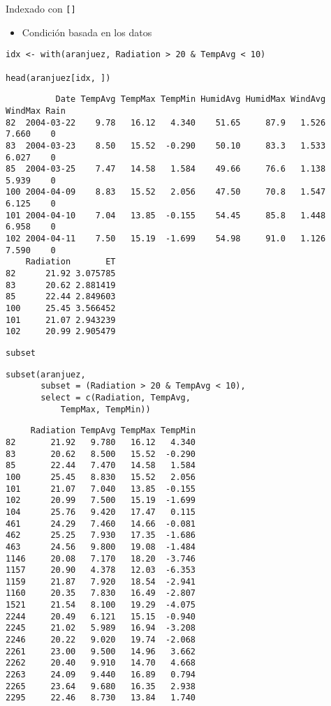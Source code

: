 \documentclass[xcolor={usenames,svgnames,dvipsnames}]{beamer}
\begin{document}
\begin{frame}[fragile,label=sec-2-2]{Indexado con \texttt{[]}}
 \begin{itemize}
\item Condición basada en los datos
\end{itemize}
\lstset{language=R,label= ,caption= ,numbers=none}
\begin{lstlisting}
idx <- with(aranjuez, Radiation > 20 & TempAvg < 10) 

head(aranjuez[idx, ])
\end{lstlisting}

\begin{verbatim}
          Date TempAvg TempMax TempMin HumidAvg HumidMax WindAvg WindMax Rain
82  2004-03-22    9.78   16.12   4.340    51.65     87.9   1.526   7.660    0
83  2004-03-23    8.50   15.52  -0.290    50.10     83.3   1.533   6.027    0
85  2004-03-25    7.47   14.58   1.584    49.66     76.6   1.138   5.939    0
100 2004-04-09    8.83   15.52   2.056    47.50     70.8   1.547   6.125    0
101 2004-04-10    7.04   13.85  -0.155    54.45     85.8   1.448   6.958    0
102 2004-04-11    7.50   15.19  -1.699    54.98     91.0   1.126   7.590    0
    Radiation       ET
82      21.92 3.075785
83      20.62 2.881419
85      22.44 2.849603
100     25.45 3.566452
101     21.07 2.943239
102     20.99 2.905479
\end{verbatim}
\end{frame}

\begin{frame}[fragile,label=sec-2-3]{\texttt{subset}}
 \lstset{language=R,label= ,caption= ,numbers=none}
\begin{lstlisting}
subset(aranjuez,
       subset = (Radiation > 20 & TempAvg < 10),
       select = c(Radiation, TempAvg,
           TempMax, TempMin))
\end{lstlisting}

\begin{verbatim}
     Radiation TempAvg TempMax TempMin
82       21.92   9.780   16.12   4.340
83       20.62   8.500   15.52  -0.290
85       22.44   7.470   14.58   1.584
100      25.45   8.830   15.52   2.056
101      21.07   7.040   13.85  -0.155
102      20.99   7.500   15.19  -1.699
104      25.76   9.420   17.47   0.115
461      24.29   7.460   14.66  -0.081
462      25.25   7.930   17.35  -1.686
463      24.56   9.800   19.08  -1.484
1146     20.08   7.170   18.20  -3.746
1157     20.90   4.378   12.03  -6.353
1159     21.87   7.920   18.54  -2.941
1160     20.35   7.830   16.49  -2.807
1521     21.54   8.100   19.29  -4.075
2244     20.49   6.121   15.15  -0.940
2245     21.02   5.989   16.94  -3.208
2246     20.22   9.020   19.74  -2.068
2261     23.00   9.500   14.96   3.662
2262     20.40   9.910   14.70   4.668
2263     24.09   9.440   16.89   0.794
2265     23.64   9.680   16.35   2.938
2295     22.46   8.730   13.84   1.740
\end{verbatim}
\end{frame}
\end{document}
